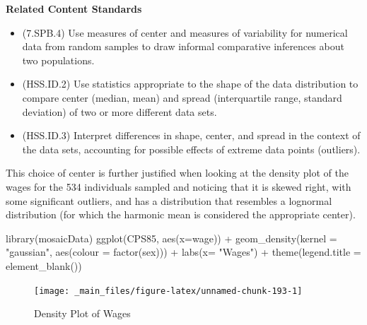 \documentclass[
]{book}
\newenvironment{Shaded}{\begin{snugshade}}{\end{snugshade}}
\newcommand{\AttributeTok}[1]{\textcolor[rgb]{0.77,0.63,0.00}{#1}}
\newcommand{\FunctionTok}[1]{\textcolor[rgb]{0.00,0.00,0.00}{#1}}
\newcommand{\NormalTok}[1]{#1}
\newcommand{\SpecialCharTok}[1]{\textcolor[rgb]{0.00,0.00,0.00}{#1}}
\newcommand{\StringTok}[1]{\textcolor[rgb]{0.31,0.60,0.02}{#1}}
\providecommand{\tightlist}{%
  \setlength{\itemsep}{0pt}\setlength{\parskip}{0pt}}
\newenvironment{standards}{}{}
\theoremstyle{definition}
\theoremstyle{definition}
\theoremstyle{definition}
\theoremstyle{definition}
\theoremstyle{remark}
\begin{document}
\begin{standards}

\begin{center}
\textbf{Related Content Standards}

\end{center}

\begin{itemize}
\tightlist
\item
  (7.SPB.4) Use measures of center and measures of variability for numerical data from random samples to draw informal comparative inferences about two populations.
\item
  (HSS.ID.2) Use statistics appropriate to the shape of the data distribution to compare center (median, mean) and spread (interquartile range, standard deviation) of two or more different data sets.
\item
  (HSS.ID.3) Interpret differences in shape, center, and spread in the context of the data sets, accounting for possible effects of extreme data points (outliers).
\end{itemize}

\end{standards}

This choice of center is further justified when looking at the density plot of the wages for the 534 individuals sampled and noticing that it is skewed right, with some significant outliers, and has a distribution that resembles a lognormal distribution (for which the harmonic mean is considered the appropriate center).

\begin{Shaded}
\begin{Highlighting}[]
\FunctionTok{library}\NormalTok{(mosaicData)}
\FunctionTok{ggplot}\NormalTok{(CPS85, }\FunctionTok{aes}\NormalTok{(}\AttributeTok{x=}\NormalTok{wage)) }\SpecialCharTok{+} \FunctionTok{geom\_density}\NormalTok{(}\AttributeTok{kernel =} \StringTok{"gaussian"}\NormalTok{, }\FunctionTok{aes}\NormalTok{(}\AttributeTok{colour =} \FunctionTok{factor}\NormalTok{(sex))) }\SpecialCharTok{+} \FunctionTok{labs}\NormalTok{(}\AttributeTok{x=} \StringTok{"Wages"}\NormalTok{) }\SpecialCharTok{+} \FunctionTok{theme}\NormalTok{(}\AttributeTok{legend.title =} \FunctionTok{element\_blank}\NormalTok{())}
\end{Highlighting}
\end{Shaded}

\begin{figure}

{\centering \texttt{[image: \_main\_files/figure-latex/unnamed-chunk-193-1]} 

}

\caption{Density Plot of Wages}\label{fig:unnamed-chunk-193}
\end{figure}
\end{document}
